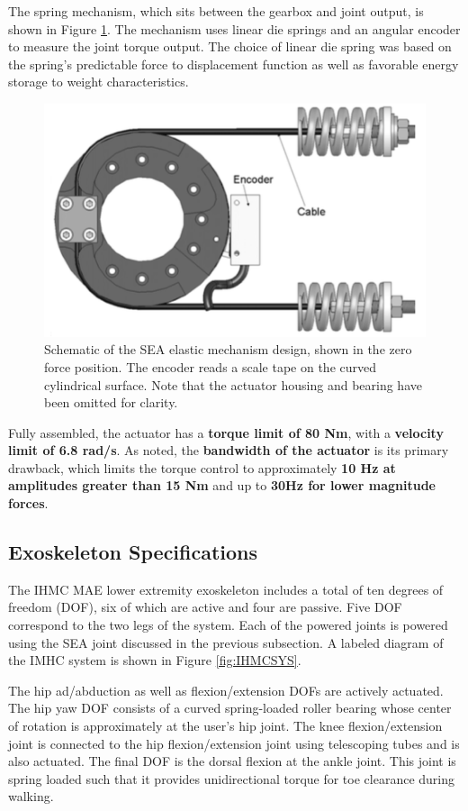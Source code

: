 \begin{refsection}
The spring mechanism, which sits between the gearbox and joint output, is shown in Figure \ref{fig:IHMCSEA}.  The mechanism uses linear die springs and an angular encoder to measure the joint torque output.  The choice of linear die spring was based on the spring's predictable force to displacement function as well as favorable energy storage to weight characteristics.  
\begin{figure}[thpb]
\centering
\includegraphics[width=3.in]{exos/figs/ihmc/seaAssm}
  \caption{Schematic of the SEA elastic mechanism design, shown in the zero force position. The encoder reads a scale tape on the curved cylindrical surface. Note that the actuator housing and bearing have been omitted for clarity.}
 \label{fig:IHMCSEA}   
 \end{figure}
 
Fully assembled, the actuator has a  {\bf torque limit of 80 Nm}, with a {\bf velocity limit of 6.8 rad/s}.  As noted, the {\bf bandwidth of the actuator} is its primary drawback, which limits the torque control to approximately {\bf 10 Hz at amplitudes greater than 15 Nm} and up to {\bf 30Hz for lower magnitude forces}. 
 
 \subsection{Exoskeleton Specifications}
 
 The IHMC MAE lower extremity exoskeleton includes a total of ten degrees of freedom (DOF), six of which are active and four are passive.  Five DOF correspond to the two legs of the system.  Each of the powered joints is powered using the SEA joint discussed in the previous subsection.  A labeled diagram of the IMHC system is shown in Figure \ref{fig:IHMCSYS}.  
 
 The hip ad/abduction as well as flexion/extension DOFs are actively actuated.  The hip yaw DOF consists of a curved spring-loaded roller bearing whose center of rotation is approximately at the user's hip joint. The knee flexion/extension joint is connected to the hip flexion/extension joint using telescoping tubes and is also actuated.  The final DOF is the dorsal flexion at the ankle joint.  This joint is spring loaded such that it provides unidirectional torque for toe clearance during walking.
 

\end{refsection}
